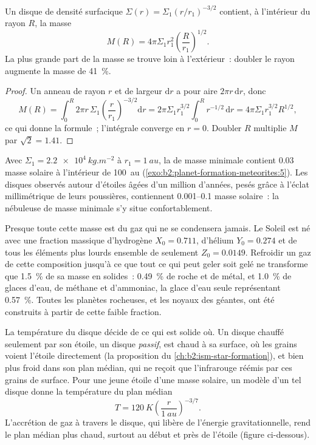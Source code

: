 \begin{proposition}\label{prop:b2:planet-formation-meteorites:disc-mass}
Un disque de densité surfacique $\Sigma(r) = \Sigma_1 (r/r_1)^{-3/2}$ contient, à
l'intérieur du rayon $R$, la masse
\[
  M(R) = 4\pi\Sigma_1 r_1^2 \left(\frac{R}{r_1}\right)^{1/2}.
\]
La plus grande part de la masse se trouve loin à l'extérieur~: doubler le rayon augmente la
masse de \qty{41}{\percent}.
\end{proposition}

\begin{proof}
Un anneau de rayon $r$ et de largeur $\mathrm dr$ a pour aire $2\pi r\,\mathrm dr$, donc
\[
  M(R) = \int_0^R 2\pi r\,\Sigma_1 \left(\frac{r}{r_1}\right)^{-3/2}\mathrm dr
       = 2\pi\Sigma_1 r_1^{3/2}\int_0^R r^{-1/2}\,\mathrm dr
       = 4\pi\Sigma_1 r_1^{3/2} R^{1/2},
\]
ce qui donne la formule~; l'intégrale converge en $r = 0$. Doubler $R$ multiplie
$M$ par $\sqrt 2 = 1.41$.
\end{proof}

Avec $\Sigma_1 = \qty{2.2e4}{kg.m^{-2}}$ à $r_1 = \qty{1}{au}$, la  de masse minimale
contient $0.03$ masse solaire à l'intérieur de \qty{100}{au}
(\cref{exo:b2:planet-formation-meteorites:5}). Les disques observés autour d'étoiles âgées d'un million
d'années, pesés grâce à l'éclat millimétrique de leurs poussières, contiennent \numrange{0.001}{0.1}
masse solaire~: la nébuleuse de masse minimale s'y situe confortablement.

Presque toute cette masse est du gaz qui ne se condensera jamais. Le Soleil est né avec
une fraction massique d'hydrogène $X_0 = 0.711$, d'hélium $Y_0 = 0.274$ et de tous les
éléments plus lourds ensemble de seulement $Z_0 = 0.0149$. Refroidir un gaz de cette
composition jusqu'à ce que tout ce qui peut geler soit gelé ne transforme que
\qty{1.5}{\percent} de sa masse en solides~: \qty{0.49}{\percent} de roche et de métal, et
\qty{1.0}{\percent} de glaces d'eau, de méthane et d'ammoniac, la glace d'eau seule
représentant \qty{0.57}{\percent}. Toutes les planètes rocheuses, et les noyaux des
géantes, ont été construits à partir de cette faible fraction.

La température du disque décide de ce qui est solide où. Un disque chauffé seulement
par son étoile, un disque \emph{passif}, est chaud à sa surface, où les grains voient
l'étoile directement (la proposition du \cref{ch:b2:ism-star-formation}), et bien plus
froid dans son plan médian, qui ne reçoit que l'infrarouge réémis par ces grains de
surface. Pour une jeune étoile d'une masse solaire, un modèle d'un tel disque donne la
température du plan médian
\[
  T = \qty{120}{K}\left(\frac{r}{\qty{1}{au}}\right)^{-3/7}.
\]
L'accrétion de gaz à travers le disque, qui libère de l'énergie gravitationnelle, rend le plan médian plus chaud, surtout au
début et près de l'étoile (figure ci-dessous).

